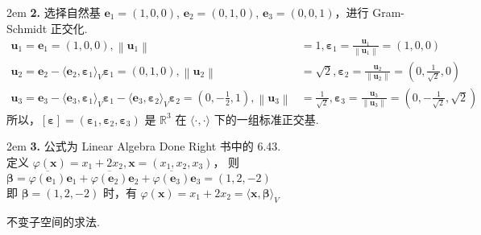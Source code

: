 \documentclass[UTF8,14pt,normal]{ctexart}
\begin{document}
    \hangindent 2em
    \noindent
    \textbf{2.} 选择自然基 $\boldsymbol{e}_{1} = (1, 0, 0)$, $\boldsymbol{e}_{2} = (0, 1, 0)$, $\boldsymbol{e}_{3} = (0, 0, 1)$，进行 Gram-Schmidt 正交化. \\
    \begin{align*}
        \boldsymbol{u}_{1} = \boldsymbol{e}_{1} = (1, 0, 0), \left\lVert \boldsymbol{u}_{1} \right\rVert & = 1, \boldsymbol{\varepsilon}_{1} =\frac{\boldsymbol{u}_{1}}{ \left\lVert \boldsymbol{u}_{1} \right\rVert } = (1, 0, 0) \\ 
        \boldsymbol{u}_{2} = \boldsymbol{e}_{2} - \langle \boldsymbol{e}_{2}, \boldsymbol{\varepsilon}_{1}\rangle_V \boldsymbol{\varepsilon}_{1} = (0,1,0), \left\lVert \boldsymbol{u}_{2} \right\rVert & = \sqrt{2}, \boldsymbol{\varepsilon}_{2} =\frac{\boldsymbol{u}_{2}}{ \left\lVert \boldsymbol{u}_{2} \right\rVert } = (0, \frac{1}{\sqrt{2}}, 0) \\
        \boldsymbol{u}_{3} = \boldsymbol{e}_{3} - \langle \boldsymbol{e}_{3}, \boldsymbol{\varepsilon}_{1}\rangle_V \boldsymbol{\varepsilon}_{1} - \langle \boldsymbol{e}_{3}, \boldsymbol{\varepsilon}_{2}\rangle_V \boldsymbol{\varepsilon}_{2} = (0,-\frac{1}{2},1), \left\lVert \boldsymbol{u}_{3} \right\rVert & = \frac{1}{\sqrt{2}}, \boldsymbol{\varepsilon}_{3} =\frac{\boldsymbol{u}_{3}}{ \left\lVert \boldsymbol{u}_{3} \right\rVert } = (0, -\frac{1}{\sqrt{2}}, \sqrt{2})
    \end{align*}
    所以，$ [\boldsymbol{\varepsilon}] = (\boldsymbol{\varepsilon}_{1}, \boldsymbol{\varepsilon}_{2}, \boldsymbol{\varepsilon}_{3})$ 是 $\mathbb{R}^{3}$ 在 $\langle \cdot, \cdot \rangle$ 下的一组标准正交基.

    \hangindent 2em
    \noindent
    \textbf{3.} 公式为 Linear Algebra Done Right 书中的 6.43.\\
    定义 $\varphi (\boldsymbol{x}) = x_{1} + 2x_{2}, \boldsymbol{x} = (x_{1}, x_{2}, x_{3})$，
    则 $\boldsymbol{\beta} = \overline{\varphi (\boldsymbol{e}_{1})}\boldsymbol{e}_{1} + \overline{\varphi (\boldsymbol{e}_{2})}\boldsymbol{e}_{2} + \overline{\varphi (\boldsymbol{e}_{3})}\boldsymbol{e}_{3} = (1, 2, -2)$\\
    即 $\boldsymbol{\beta} = (1, 2, -2)$ 时，有 $\varphi (\boldsymbol{x}) = x_{1} + 2x_{2} = \langle \boldsymbol{x}, \boldsymbol{\beta}\rangle_V$
   
 不变子空间的求法.
\end{document}
